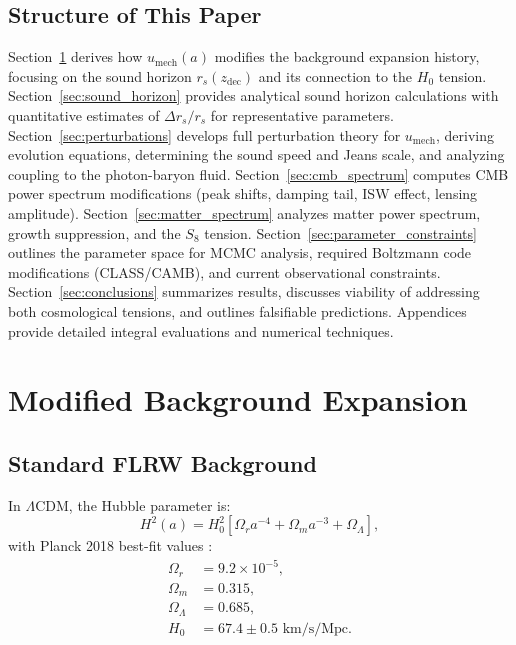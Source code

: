 \documentclass[11pt,a4paper]{article}
\newcommand{\umech}{\ensuremath{u_{\mathrm{mech}}}}
\newcommand{\zdec}{\ensuremath{z_{\mathrm{dec}}}}
\newcommand{\rs}{\ensuremath{r_s}}
\newcommand{\Omm}{\ensuremath{\Omega_m}}
\newcommand{\Omr}{\ensuremath{\Omega_r}}
\newcommand{\OmL}{\ensuremath{\Omega_\Lambda}}
\theoremstyle{definition}
\theoremstyle{remark}
\begin{document}
\subsection{Structure of This Paper}
\label{sec:structure}

Section~\ref{sec:background} derives how $\umech(a)$ modifies the background expansion history, focusing on the sound horizon $\rs(\zdec)$ and its connection to the $H_0$ tension. Section~\ref{sec:sound_horizon} provides analytical sound horizon calculations with quantitative estimates of $\Delta\rs/\rs$ for representative parameters. Section~\ref{sec:perturbations} develops full perturbation theory for $\umech$, deriving evolution equations, determining the sound speed and Jeans scale, and analyzing coupling to the photon-baryon fluid. Section~\ref{sec:cmb_spectrum} computes CMB power spectrum modifications (peak shifts, damping tail, ISW effect, lensing amplitude). Section~\ref{sec:matter_spectrum} analyzes matter power spectrum, growth suppression, and the $S_8$ tension. Section~\ref{sec:parameter_constraints} outlines the parameter space for MCMC analysis, required Boltzmann code modifications (CLASS/CAMB), and current observational constraints. Section~\ref{sec:conclusions} summarizes results, discusses viability of addressing both cosmological tensions, and outlines falsifiable predictions. Appendices provide detailed integral evaluations and numerical techniques.

\section{Modified Background Expansion}
\label{sec:background}

\subsection{Standard FLRW Background}
\label{sec:standard_background}

In $\Lambda$CDM, the Hubble parameter is:
\begin{equation}
H^2(a) = H_0^2 \left[ \Omr a^{-4} + \Omm a^{-3} + \OmL \right],
\end{equation}
with Planck 2018 best-fit values \cite{Planck2018}:
\begin{align}
\Omr &= 9.2 \times 10^{-5}, \\
\Omm &= 0.315, \\
\OmL &= 0.685, \\
H_0 &= 67.4 \pm 0.5 \text{ km/s/Mpc}.
\end{align}
\end{document}
